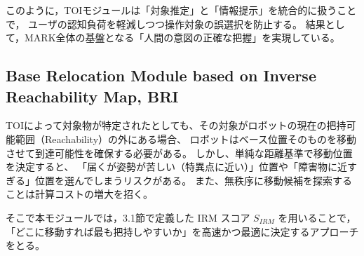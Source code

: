 \documentclass[../../main.tex]{subfiles} %
\begin{document}
このように，TOIモジュールは「対象推定」と「情報提示」を統合的に扱うことで，
ユーザの認知負荷を軽減しつつ操作対象の誤選択を防止する。
結果として，MARK全体の基盤となる「人間の意図の正確な把握」を実現している。


\subsection{Base Relocation Module based on Inverse Reachability Map, BRI}

TOIによって対象物が特定されたとしても、その対象がロボットの現在の把持可能範囲（Reachability）の外にある場合、
ロボットはベース位置そのものを移動させて到達可能性を確保する必要がある。
しかし、単純な距離基準で移動位置を決定すると、
「届くが姿勢が苦しい（特異点に近い）」位置や「障害物に近すぎる」位置を選んでしまうリスクがある。
また、無秩序に移動候補を探索することは計算コストの増大を招く。

そこで本モジュールでは，3.1節で定義した IRM スコア $S_{IRM}$ を用いることで，
「どこに移動すれば最も把持しやすいか」を高速かつ最適に決定するアプローチをとる。




\end{document}
